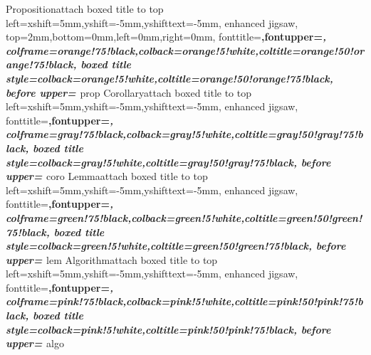 %
{Proposition}{attach boxed title to top 	left={xshift=5mm,yshift=-5mm,yshifttext=-5mm},
	enhanced jigsaw,
	top=2mm,bottom=0mm,left=0mm,right=0mm,
	fonttitle=\bfseries\large,fontupper=\itshape,
	colframe=orange!75!black,colback=orange!5!white,coltitle=orange!50!orange!75!black,
	boxed title style={colback=orange!5!white,coltitle=orange!50!orange!75!black},
	before upper={
		}
}{prop}%
%
{Corollary}{attach boxed title to top 	left={xshift=5mm,yshift=-5mm,yshifttext=-5mm},
	enhanced jigsaw,
	fonttitle=\bfseries\large,fontupper=\slshape,
	colframe=gray!75!black,colback=gray!5!white,coltitle=gray!50!gray!75!black,
	boxed title style={colback=gray!5!white,coltitle=gray!50!gray!75!black},
	before upper={
		}
}{coro}%
%
{Lemma}{attach boxed title to top 	left={xshift=5mm,yshift=-5mm,yshifttext=-5mm},
	enhanced jigsaw,
	fonttitle=\bfseries\large,fontupper=\itshape,
	colframe=green!75!black,colback=green!5!white,coltitle=green!50!green!75!black,
	boxed title style={colback=green!5!white,coltitle=green!50!green!75!black},
	before upper={
		}
}{lem}%
%
{Algorithm}{attach boxed title to top 	left={xshift=5mm,yshift=-5mm,yshifttext=-5mm},
	enhanced jigsaw,
	fonttitle=\bfseries\large,fontupper=\itshape,
	colframe=pink!75!black,colback=pink!5!white,coltitle=pink!50!pink!75!black,
	boxed title style={colback=pink!5!white,coltitle=pink!50!pink!75!black},
	before upper={
		}
}{algo}%
